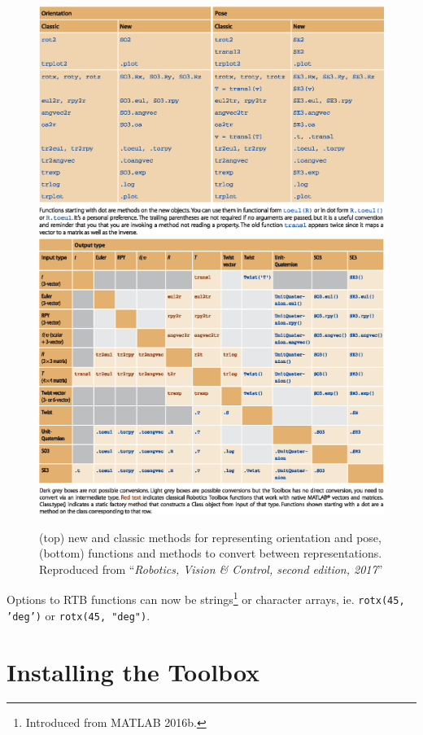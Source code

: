 \documentclass[a4paper,twoside]{report}
\begin{document}
\begin{figure}[p]
\centering
\includegraphics[width=\textwidth]{figs/CT-02-03.eps}
\includegraphics[width=\textwidth]{figs/CT-02-02.eps}
\caption{(top) new and classic methods for representing orientation and pose, (bottom) functions and methods to convert
between representations.  Reproduced from ``\textit{Robotics, Vision \& Control, second edition, 2017}''}\label{fig:newfunctions}
\end{figure}



Options to RTB functions can now be strings\footnote{Introduced from MATLAB 2016b.} or character arrays, ie. \texttt{rotx(45, 'deg')} or \texttt{rotx(45, "deg")}.  

\section{Installing the Toolbox}
\end{document}
